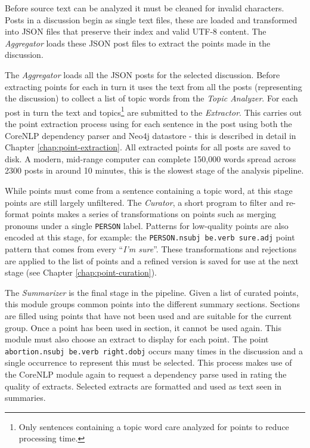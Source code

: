   Before source text can be analyzed it must be cleaned for invalid characters. Posts in a discussion begin as single text files, these are loaded and transformed into JSON files that preserve their index and valid UTF-8 content. The \textit{Aggregator} loads these JSON post files to extract the points made in the discussion.

  The \textit{Aggregator} loads all the JSON posts for the selected discussion. Before extracting points for each in turn it uses the text from all the posts (representing the discussion) to collect a list of topic words from the \textit{Topic Analyzer}. For each post in turn the text and topics\footnote{Only sentences containing a topic word care analyzed for points to reduce processing time.} are submitted to the \textit{Extractor}. This carries out the point extraction process using for each sentence in the post using both the CoreNLP dependency parser and Neo4j datastore - this is described in detail in Chapter \ref{chap:point-extraction}. All extracted points for all posts are saved to disk. A modern, mid-range computer can complete 150,000 words spread across 2300 posts in around 10 minutes, this is the slowest stage of the analysis pipeline.

  While points must come from a sentence containing a topic word, at this stage points are still largely unfiltered. The \textit{Curator}, a short program to filter and re-format points makes a series of transformations on points such as merging pronouns under a single \texttt{PERSON} label. Patterns for low-quality points are also encoded at this stage, for example: the \texttt{PERSON.nsubj be.verb sure.adj} point pattern that comes from every ``\textit{I'm sure}''. These transformations and rejections are applied to the list of points and a refined version is saved for use at the next stage (see Chapter \ref{chap:point-curation}).

  The \textit{Summarizer} is the final stage in the pipeline. Given a list of curated points, this module groups common points into the different summary sections. Sections are filled using points that have not been used and are suitable for the current group. Once a point has been used in section, it cannot be used again. This module must also choose an extract to display for each point. The point \texttt{abortion.nsubj be.verb right.dobj} occurs many times in the discussion and a single occurrence to represent this must be selected. This process makes use of the CoreNLP module again to request a dependency parse used in rating the quality of extracts. Selected extracts are formatted and used as text seen in summaries.

